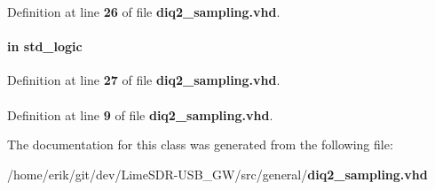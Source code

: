 Definition at line {\bf 26} of file {\bf diq2\+\_\+sampling.\+vhd}.

\paragraph[{rxiqsel}]{ {\bfseries \textcolor{keywordflow}{in}\textcolor{vhdlchar}{ }} {\bfseries \textcolor{comment}{std\+\_\+logic}\textcolor{vhdlchar}{ }} \hspace{0.3cm}{\ttfamily [Port]}}\label{classdiq2__sampling_a5f8c9b4907f6c220852b7ecbeba0f725}


Definition at line {\bf 27} of file {\bf diq2\+\_\+sampling.\+vhd}.

\paragraph[{std\+\_\+logic\+\_\+1164}]{\hspace{0.3cm}{\ttfamily [Package]}}\label{classdiq2__sampling_acd03516902501cd1c7296a98e22c6fcb}


Definition at line {\bf 9} of file {\bf diq2\+\_\+sampling.\+vhd}.



The documentation for this class was generated from the following file\+:\begin{DoxyCompactItemize}
\item 
/home/erik/git/dev/\+Lime\+S\+D\+R-\/\+U\+S\+B\+\_\+\+G\+W/src/general/{\bf diq2\+\_\+sampling.\+vhd}\end{DoxyCompactItemize}
